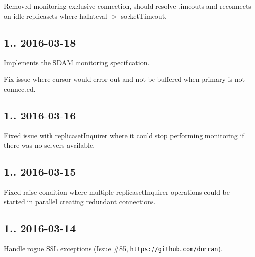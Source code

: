 \begin{DoxyItemize}
\item Removed monitoring exclusive connection, should resolve timeouts and reconnects on idle replicasets where ha\+Inteval $>$ socket\+Timeout.
\end{DoxyItemize}

\subsection*{1.. 2016-\/03-\/18 }


\begin{DoxyItemize}
\item Implements the S\+D\+AM monitoring specification.
\item Fix issue where cursor would error out and not be buffered when primary is not connected.
\end{DoxyItemize}

\subsection*{1.. 2016-\/03-\/16 }


\begin{DoxyItemize}
\item Fixed issue with replicaset\+Inquirer where it could stop performing monitoring if there was no servers available.
\end{DoxyItemize}

\subsection*{1.. 2016-\/03-\/15 }


\begin{DoxyItemize}
\item Fixed raise condition where multiple replicaset\+Inquirer operations could be started in parallel creating redundant connections.
\end{DoxyItemize}

\subsection*{1.. 2016-\/03-\/14 }


\begin{DoxyItemize}
\item Handle rogue S\+SL exceptions (Issue \#85, \href{https://github.com/durran}{\tt https\+://github.\+com/durran}).
\end{DoxyItemize}

